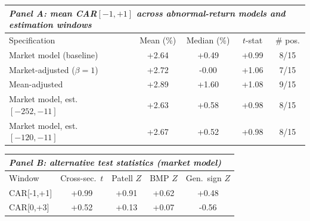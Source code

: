 \begin{tabular}{lcccc}
\multicolumn{5}{l}{\textit{Panel A: mean CAR$[-1,+1]$ across abnormal-return models and estimation windows}}\\
\toprule
Specification & Mean (\%) & Median (\%) & $t$-stat & \# pos. \\
\midrule
Market model (baseline) & +2.64 & +0.49 & +0.99 & 8/15 \\
Market-adjusted ($\beta=1$) & +2.72 & -0.00 & +1.06 & 7/15 \\
Mean-adjusted & +2.89 & +1.60 & +1.08 & 9/15 \\
Market model, est.\ $[-252,-11]$ & +2.63 & +0.58 & +0.98 & 8/15 \\
Market model, est.\ $[-120,-11]$ & +2.67 & +0.52 & +0.98 & 8/15 \\
\bottomrule
\end{tabular}

\vspace{6pt}

\begin{tabular}{lcccc}
\multicolumn{5}{l}{\textit{Panel B: alternative test statistics (market model)}}\\
\toprule
Window & Cross-sec.\ $t$ & Patell $Z$ & BMP $Z$ & Gen.\ sign $Z$ \\
\midrule
CAR[-1,+1] & +0.99 & +0.91 & +0.62 & +0.48 \\
CAR[0,+3] & +0.52 & +0.13 & +0.07 & -0.56 \\
\bottomrule
\end{tabular}